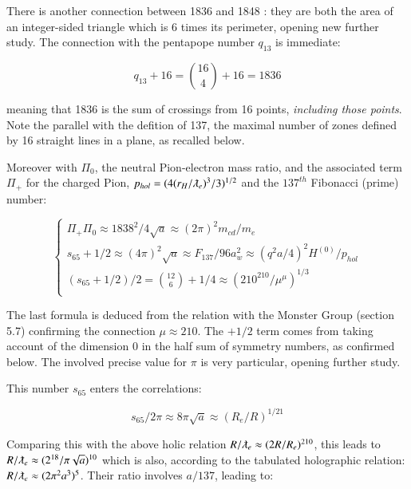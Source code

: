 \documentclass[a4paper,9pt]{article}
\begin{document}
There is another connection between 1836 and 1848 : they are both the area of an integer-sided triangle which is 6 times its perimeter, opening new further study. The connection with the pentapope number $q_{13}$ is immediate:

\begin{equation}
 q_{13}+16 = \binom{16}{4} + 16 = 1836
 \end{equation}
 
meaning that 1836 is the sum of crossings from 16 points, \textit {including those points}. Note the parallel with the defition of 137, the maximal number of zones defined by 16 straight lines in a plane, as recalled below.

Moreover with $\Pi_0$, the neutral Pion-electron mass ratio, and the associated term $\Pi_+$ for the charged Pion, $ p_{hol} = (4 (r_H/\lambdabar_e)^3/3)^{1/2}$ and the $137^{th}$ Fibonacci (prime) number:

 \begin{equation}
 \left\{
    \begin{array}{ll}
         \Pi_+ \Pi_0 \approx  1838^2/4\sqrt a \approx (2\pi)^2 m_{cd}/m_e \\
        s_{65} + 1/2 \approx (4\pi)^2 \sqrt a \approx F_{137}/96 a_w^2 \approx (q^2a/4)^2 H^{(0)}/p_{hol} \\
          (s_{65} +1/2)/2 = \binom{12}{6} + 1/4 \approx(210^{210}/\mu^{\mu})^{1/3} \\
    \end{array}
\right.
\end{equation}

The last formula is deduced from the relation with the Monster Group (section 5.7) confirming the connection $\mu \approx 210$. The $+1/2$ term comes from taking account of the dimension $0$ in the half sum of symmetry numbers, as confirmed below. The involved precise value for $\pi$ is very particular, opening further study.

This number $s_{65}$ enters the correlations:

\begin{equation}
s_{65}/2\pi \approx 8\pi \sqrt a \approx (R_e/R)^{1/21}
 \end{equation}

Comparing this with the above holic relation $R/ \lambdabar_e \approx (2R/R_e)^{210}$, this leads to $R/\lambdabar_e \approx (2^{18}/\pi \sqrt a)^{10}$ which is also, according to the tabulated holographic relation: $R/\lambdabar_e \approx (2 \pi^2 a^3)^{5}$. Their ratio involves $a/137$, leading to: 
\end{document}
